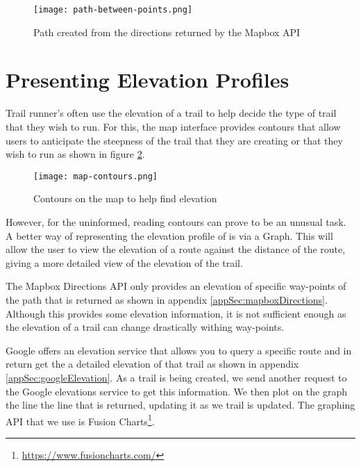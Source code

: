 \begin{figure}[ht]
    \centering
    \texttt{[image: path-between-points.png]}
    \caption{Path created from the directions returned by the Mapbox API}
    \label{fig:PathCreated}
\end{figure}

\section{Presenting Elevation Profiles} \label{elevationProfile}
Trail runner's often use the elevation of a trail to help decide the type of trail that they wish to run. For this, the map interface provides contours that allow users to anticipate the steepness of the trail that they are creating or that they wish to run as shown in figure \ref{fig:MapContours}.

\begin{figure}[ht]
    \centering
    \texttt{[image: map-contours.png]}
    \caption{Contours on the map to help find elevation}
    \label{fig:MapContours}
\end{figure}


However, for the uninformed, reading contours can prove to be an unusual task. A better way of representing the elevation profile of is via a Graph. This will allow the user to view the elevation of a route against the distance of the route, giving a more detailed view of the elevation of the trail.

The Mapbox Directions API only provides an elevation of specific way-points of the path that is returned as shown in appendix \ref{appSec:mapboxDirections}. Although this provides some elevation information, it is not sufficient enough as the elevation of a trail can change drastically withing way-points.

Google offers an elevation service that allows you to query a specific route and in return get the a detailed elevation of that trail as shown in appendix \ref{appSec:googleElevation}. As a trail is being created, we send another request to the Google elevations service to get this information. We then plot on the graph the line the line that is returned, updating it as we trail is updated. The graphing API that we use is Fusion Charts\footnote{\url{https://www.fusioncharts.com/}}.